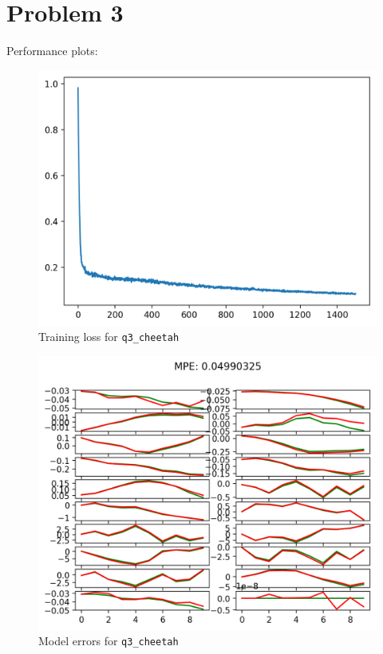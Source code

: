 \documentclass[11pt]{article}
\begin{document}
\clearpage

\section{Problem 3}
\label{sec:org457aaf3}
Performance plots:

\begin{figure}[htbp]
\centering
\includegraphics[width=.9\linewidth]{./hw2_q3_cheetah_cheetah-ift6163-v0_17-02-2022_22-07-54/itr_0_losses.png}
\caption{Training loss for \texttt{q3\_cheetah}}
\end{figure}

\begin{figure}[htbp]
\centering
\includegraphics[width=.9\linewidth]{./hw2_q3_cheetah_cheetah-ift6163-v0_17-02-2022_22-07-54/itr_0_predictions.png}
\caption{Model errors for \texttt{q3\_cheetah}}
\end{figure}
\end{document}
